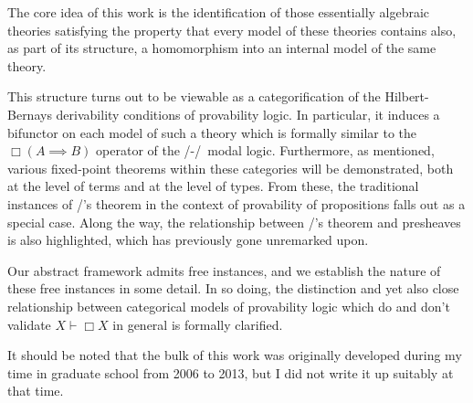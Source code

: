 The core idea of this work is the identification of those essentially algebraic theories satisfying the property that every model of these theories contains also, as part of its structure, a homomorphism into an internal model of the same theory.

This structure turns out to be viewable as a categorification of the Hilbert-Bernays derivability conditions of provability logic. In particular, it induces a bifunctor on each model of such a theory which is formally similar to the $\Box(A \implies B)$ operator of the \Goedel/-\Loeb/\ modal logic. Furthermore, as mentioned, various fixed-point theorems within these categories will be demonstrated, both at the level of terms and at the level of types. From these, the traditional instances of \Loeb/'s theorem in the context of provability of propositions falls out as a special case. Along the way, the relationship between \Loeb/'s theorem and presheaves is also highlighted, which has previously gone unremarked upon.

Our abstract framework admits free instances, and we establish the nature of these free instances in some detail. In so doing, the distinction and yet also close relationship between categorical models of provability logic which do and don't validate $X \vdash \Box X$ in general is formally clarified.

It should be noted that the bulk of this work was originally developed during my time in graduate school from 2006 to 2013, but I did not write it up suitably at that time.

\fileend